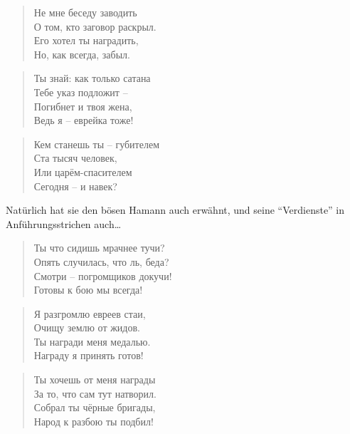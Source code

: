\documentclass[12pt,a4paper,titlepage]{article}
\begin{document}
\begin{drama}
\espeaks
\begin{verse}
Не мне беседу заводить\\
О том, кто заговор раскрыл.\\
Его хотел ты наградить,\\
Но, как всегда, забыл.\\
\end{verse}

\begin{verse}
Ты знай: как только сатана\\
Тебе указ подложит --\\
Погибнет и твоя жена,\\
Ведь я -- еврейка тоже!\\
\end{verse}

\begin{verse}
Кем станешь ты -- губителем\\
Ста тысяч человек,\\
Или царём-спасителем\\
Сегодня -- и навек?\\
\end{verse}


\uespeaks
Natürlich hat sie den bösen Hamann auch erwähnt, und seine
"`Verdienste"' in Anführungsstrichen auch\ldots



\scene


\amspeaks {}
\begin{verse}
Ты что сидишь мрачнее тучи?\\
Опять случилась, что ль, беда?\\
Смотри -- погромщиков докучи!\\
Готовы к бою мы всегда!\\
\end{verse}

\begin{verse}
Я разгромлю евреев стаи,\\
Очищу землю от жидов.\\
Ты награди меня медалью.\\
Награду я принять готов!\\
\end{verse}


\ahspeaks {}
\begin{verse}
Ты хочешь от меня награды\\
За то, что сам тут натворил.\\
Собрал ты чёрные бригады,\\
Народ к разбою ты подбил!\\
\end{verse}


\end{drama}
\end{document}
